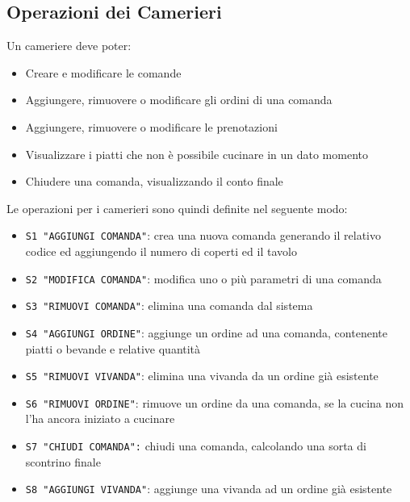 \documentclass[a4paper,12pt]{report}
\begin{document}
\subsection{Operazioni dei Camerieri}\label{sec:waiters}
%
Un cameriere deve poter:
%
\begin{itemize}
    \item Creare e modificare le comande
    \item Aggiungere, rimuovere o modificare gli ordini di una comanda
    \item Aggiungere, rimuovere o modificare le prenotazioni
    \item Visualizzare i piatti che non è possibile cucinare in un dato momento
    \item Chiudere una comanda, visualizzando il conto finale
\end{itemize}
%
Le operazioni per i camerieri sono quindi definite nel seguente modo:
%
\begin{itemize}
    \item \texttt{S1 "AGGIUNGI COMANDA"}: crea una nuova comanda generando il relativo codice ed aggiungendo il numero di coperti ed il tavolo
    \item\texttt{S2 "MODIFICA COMANDA"}: modifica uno o più parametri di una comanda 
    \item\texttt{S3 "RIMUOVI COMANDA"}: elimina una comanda dal sistema 
    \item\texttt{S4 "AGGIUNGI ORDINE"}: aggiunge un ordine ad una comanda, contenente piatti o bevande e relative quantità
    \item\texttt{S5 "RIMUOVI VIVANDA"}: elimina una vivanda da un ordine già esistente
    \item\texttt{S6 "RIMUOVI ORDINE"}: rimuove un ordine da una comanda, se la cucina non l’ha ancora iniziato a cucinare 
    \item\texttt{S7 "CHIUDI COMANDA":} chiudi una comanda, calcolando una sorta di scontrino finale 
    \item\texttt{S8 "AGGIUNGI VIVANDA"}: aggiunge una vivanda ad un ordine già esistente
\end{itemize}
%
\end{document}
